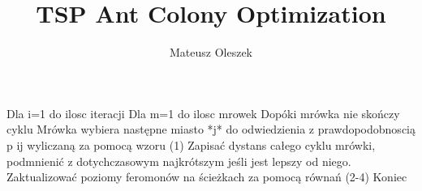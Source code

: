\documentclass[12pt,a4paper]{article}
\author{Mateusz Oleszek}
\title{TSP Ant Colony Optimization}
\begin{document}
Dla i=1 do ilosc iteracji
	Dla m=1 do ilosc mrowek
		Dopóki mrówka nie skończy cyklu
			Mrówka wybiera następne miasto *j* do odwiedzienia z prawdopodobnoscią p ij wyliczaną za pomocą wzoru (1)
		Zapisać dystans całego cyklu mrówki, podmnienić z dotychczasowym najkrótszym jeśli jest lepszy od niego.
	Zaktualizować poziomy feromonów na ścieżkach za pomocą równań (2-4)
Koniec
\end{document}
